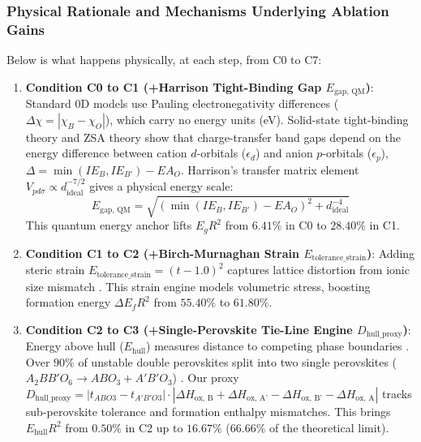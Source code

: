 \documentclass[journal=jcisd8,manuscript=article]{achemso}
\begin{document}
\subsubsection{Physical Rationale and Mechanisms Underlying Ablation Gains}
Below is what happens physically, at each step, from C0 to C7:

\begin{enumerate}
\item \textbf{Condition C0 to C1 (+Harrison Tight-Binding Gap $E_{\text{gap, QM}}$)}: Standard 0D models use Pauling electronegativity differences ($\Delta\chi = |\chi_B - \chi_O|$), which carry no energy units (eV). Solid-state tight-binding theory \cite{harrison1999elementary} and ZSA theory \cite{zaanen1985band} show that charge-transfer band gaps depend on the energy difference between cation $d$-orbitals ($\epsilon_d$) and anion $p$-orbitals ($\epsilon_p$), $\Delta = \min(IE_B, IE_{B'}) - EA_O$. Harrison's transfer matrix element $V_{pd\sigma} \propto d_{\text{ideal}}^{-7/2}$ gives a physical energy scale:
\begin{equation}
E_{\text{gap, QM}} = \sqrt{\left(\min(IE_B, IE_{B'}) - EA_O\right)^2 + d_{\text{ideal}}^{-4}}
\end{equation}
This quantum energy anchor lifts $E_g R^2$ from $6.41\%$ in C0 to \textbf{$28.40\%$} in C1.

\item \textbf{Condition C1 to C2 (+Birch-Murnaghan Strain $E_{\text{tolerance\_strain}}$)}: Adding steric strain $E_{\text{tolerance\_strain}} = (t - 1.0)^2$ captures lattice distortion from ionic size mismatch \cite{goldschmidt1926gesetze, woodward1997octahedral}. This strain engine models volumetric stress, boosting formation energy $\Delta E_f R^2$ from $55.40\%$ to \textbf{$61.80\%$}.

\item \textbf{Condition C2 to C3 (+Single-Perovskite Tie-Line Engine $D_{\text{hull\_proxy}}$)}: Energy above hull ($E_{\text{hull}}$) measures distance to competing phase boundaries \cite{sun2016thermodynamic}. Over $90\%$ of unstable double perovskites split into two single perovskites ($A_2BB'O_6 \rightarrow ABO_3 + A'B'O_3$) \cite{yamashita2018band}. Our proxy $D_{\text{hull\_proxy}} = |t_{ABO3} - t_{A'B'O3}| \cdot |\Delta H_{\text{ox, B}} + \Delta H_{\text{ox, A'}} - \Delta H_{\text{ox, B'}} - \Delta H_{\text{ox, A}}|$ tracks sub-perovskite tolerance and formation enthalpy mismatches. This brings $E_{\text{hull}} R^2$ from $0.50\%$ in C2 up to \textbf{$16.67\%$} ($66.66\%$ of the theoretical limit).


\end{enumerate}
\end{document}
